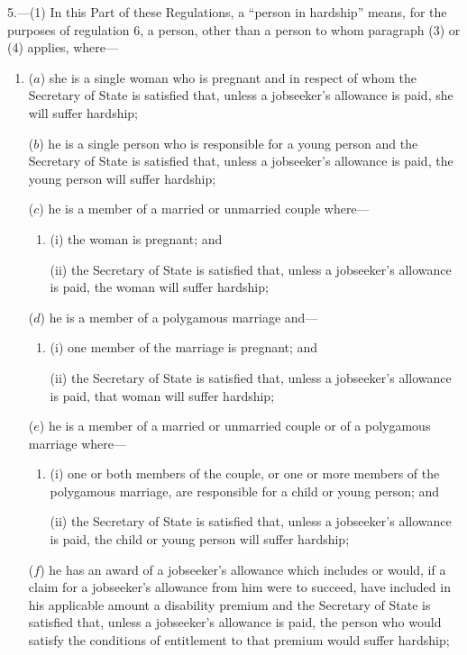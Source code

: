 \documentclass[12pt,a4paper]{article}
\begin{document}
5.---(1)  In this Part of these Regulations, a “person in hardship” means, for the purposes of regulation 6, a person, other than a person to whom paragraph (3) or (4) applies, where—
\begin{enumerate}\item[]
($a$) she is a single woman who is pregnant and in respect of whom the Secretary of State is satisfied that, unless a jobseeker’s allowance is paid, she will suffer hardship;

($b$) he is a single person who is responsible for a young person and the Secretary of State is satisfied that, unless a jobseeker’s allowance is paid, the young person will suffer hardship;

($c$) he is a member of a married or unmarried couple where—
\begin{enumerate}\item[]
(i) the woman is pregnant; and

(ii) the Secretary of State is satisfied that, unless a jobseeker’s allowance is paid, the woman will suffer hardship;
\end{enumerate}

($d$) he is a member of a polygamous marriage and—
\begin{enumerate}\item[]
(i) one member of the marriage is pregnant; and

(ii) the Secretary of State is satisfied that, unless a jobseeker’s allowance is paid, that woman will suffer hardship;
\end{enumerate}

($e$) he is a member of a married or unmarried couple or of a polygamous marriage where—
\begin{enumerate}\item[]
(i) one or both members of the couple, or one or more members of the polygamous marriage, are responsible for a child or young person; and

(ii) the Secretary of State is satisfied that, unless a jobseeker’s allowance is paid, the child or young person will suffer hardship;
\end{enumerate}

($f$) he has an award of a jobseeker’s allowance which includes or would, if a claim for a jobseeker’s allowance from him were to succeed, have included in his applicable amount a disability premium and the Secretary of State is satisfied that, unless a jobseeker’s allowance is paid, the person who would satisfy the conditions of entitlement to that premium would suffer hardship;


\end{enumerate}
\end{document}
